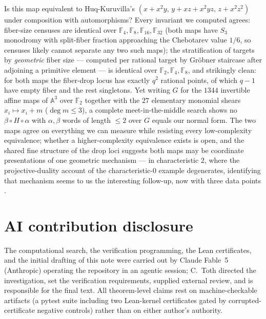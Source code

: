 \documentclass[11pt]{amsart}
\newcommand{\F}{\mathbb{F}}
\newcommand{\A}{\mathbb{A}}
\begin{document}
Is this map equivalent to Huq-Kuruvilla's
$(x + x^2y,\, y + xz + x^2yz,\, z + x^2z^2)$ under composition with
automorphisms? Every invariant we computed agrees: fiber-size censuses
are identical over $\F_4, \F_8, \F_{16}, \F_{32}$ (both maps have $S_3$
monodromy with split-fiber fraction approaching the Chebotarev value
$1/6$, so censuses likely cannot separate any two such maps); the
stratification of targets by \emph{geometric} fiber size --- computed
per rational target by Gr\"obner staircase after adjoining a primitive
element --- is identical over $\F_2, \F_4, \F_8$, and strikingly clean:
for both maps the fiber-drop locus has exactly $q^2$ rational points,
of which $q-1$ have empty fiber and the rest singletons. Yet writing
$G$ for the $1344$ invertible affine maps of $\A^3$ over $\F_2$
together with the $27$ elementary monomial shears
$x_i \mapsto x_i + m$ ($\deg m \le 3$), a complete meet-in-the-middle
search shows no $\beta \circ H \circ \alpha$ with $\alpha, \beta$ words
of length $\le 2$ over $G$ equals our normal form. The two maps agree
on everything we can measure while resisting every low-complexity
equivalence; whether a higher-complexity equivalence exists is open,
and the shared fine structure of the drop loci suggests both maps may
be coordinate presentations of one geometric mechanism --- in
characteristic $2$, where the projective-duality account of the
characteristic-$0$ example \cite{sbs} degenerates, identifying that
mechanism seems to us the interesting follow-up, now with three data
points \cite{hk,mondello}.

\section*{AI contribution disclosure}

The computational search, the verification programming, the Lean
certificates, and the initial drafting of this note were carried out by
Claude Fable~5 (Anthropic) operating the repository \cite{repo} in an
agentic session; C.~Toth directed the investigation, set the
verification requirements, supplied external review, and is responsible
for the final text. All theorem-level claims rest on machine-checkable
artifacts (a pytest suite including two Lean-kernel certificates gated
by corrupted-certificate negative controls) rather than on either
author's authority.
\end{document}
